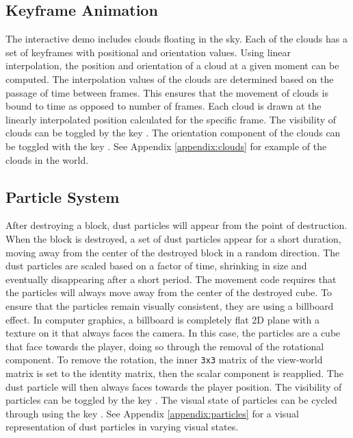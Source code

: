 \documentclass[a4paper,11pt,titlepage]{scrartcl}
\begin{document}
\subsection{Keyframe Animation}
\label{section:animation}
The interactive demo includes clouds floating in the sky. Each of the clouds has a set of keyframes with positional and orientation values. Using linear interpolation, the position and orientation of a cloud at a given moment can be computed. The interpolation values of the clouds are determined based on the passage of time between frames. This ensures that the movement of clouds is bound to time as opposed to number of frames. Each cloud is drawn at the linearly interpolated position calculated for the specific frame.
\vskip 2.5mm\noindent
The visibility of clouds can be toggled by the key . The orientation component of the clouds can be toggled with the key . See Appendix \ref{appendix:clouds} for example of the clouds in the world.

\subsection{Particle System}
\label{section:particles}
After destroying a block, dust particles will appear from the point of destruction. When the block is destroyed, a set of dust particles appear for a short duration, moving away from the center of the destroyed block in a random direction. The dust particles are scaled based on a factor of time, shrinking in size and eventually disappearing after a short period. The movement code requires that the particles will always move away from the center of the destroyed cube. To ensure that the particles remain visually consistent, they are using a billboard effect. In computer graphics, a billboard is completely flat 2D plane with a texture on it that always faces the camera. In this case, the particles are a cube that face towards the player, doing so through the removal of the rotational component. To remove the rotation, the inner \texttt{3x3} matrix of the view-world matrix is set to the identity matrix, then the scalar component is reapplied. The dust particle will then always faces towards the player position.
\vskip 2.5mm\noindent
The visibility of particles can be toggled by the key . The visual state of particles can be cycled through using the key . See Appendix \ref{appendix:particles} for a visual representation of dust particles in varying visual states.
\end{document}
